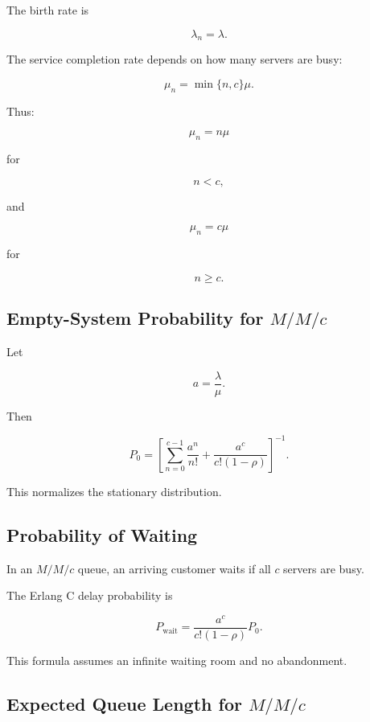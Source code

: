 The birth rate is

\[
\boxed{
\lambda_n=\lambda.
}
\]

The service completion rate depends on how many servers are busy:

\[
\boxed{
\mu_n
=
\min\{n,c\}\mu.
}
\]

Thus:

\[
\mu_n
=
n\mu
\]

for

\[
n<c,
\]

and

\[
\mu_n
=
c\mu
\]

for

\[
n\geq c.
\]

\subsection{Empty-System Probability for \(M/M/c\)}
\label{subsec:mmc-p0}

Let

\[
a
=
\frac{\lambda}{\mu}.
\]

Then

\[
\boxed{
P_0
=
\left[
\sum_{n=0}^{c-1}
\frac{
a^n
}{
n!
}
+
\frac{
a^c
}{
c!(1-\rho)
}
\right]^{-1}.
}
\]

This normalizes the stationary distribution.

\subsection{Probability of Waiting}
\label{subsec:erlang-c}

In an \(M/M/c\) queue, an arriving customer waits if all \(c\) servers are
busy.

The Erlang C delay probability is

\[
\boxed{
P_{\mathrm{wait}}
=
\frac{
a^c
}{
c!(1-\rho)
}
P_0.
}
\]

This formula assumes an infinite waiting room and no abandonment.

\subsection{Expected Queue Length for \(M/M/c\)}
\label{subsec:mmc-Lq}

